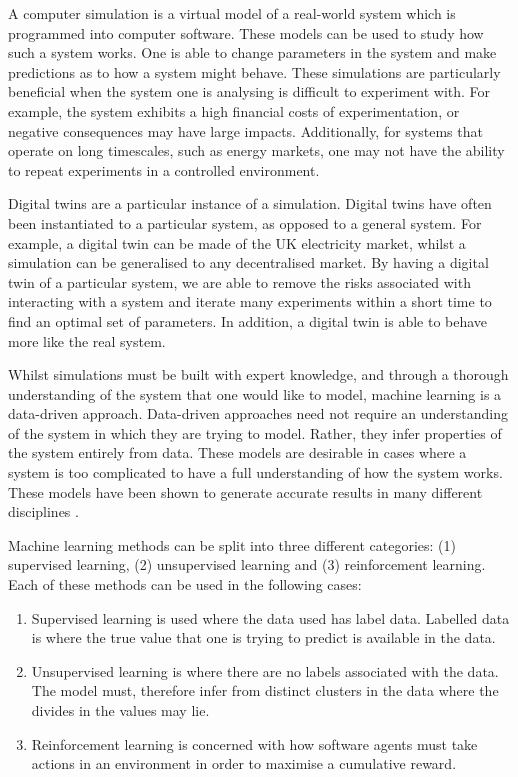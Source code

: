 A computer simulation is a virtual model of a real-world system which is programmed into computer software. These models can be used to study how such a system works. One is able to change parameters in the system and make predictions as to how a system might behave. These simulations are particularly beneficial when the system one is analysing is difficult to experiment with. For example, the system exhibits a high financial costs of experimentation, or negative consequences may have large impacts. Additionally, for systems that operate on long timescales, such as energy markets, one may not have the ability to repeat experiments in a controlled environment.

Digital twins are a particular instance of a simulation. Digital twins have often been instantiated to a particular system, as opposed to a general system. For example, a digital twin can be made of the UK electricity market, whilst a simulation can be generalised to any decentralised market. By having a digital twin of a particular system, we are able to remove the risks associated with interacting with a system and iterate many experiments within a short time to find an optimal set of parameters. In addition, a digital twin is able to behave more like the real system.

Whilst simulations must be built with expert knowledge, and through a thorough understanding of the system that one would like to model, machine learning is a data-driven approach. Data-driven approaches need not require an understanding of the system in which they are trying to model. Rather, they infer properties of the system entirely from data. These models are desirable in cases where a system is too complicated to have a full understanding of how the system works. These models have been shown to generate accurate results in many different disciplines \cite{Covington2016,WarrenLiao2005,Wiens2009}.

Machine learning methods can be split into three different categories: (1) supervised learning, (2) unsupervised learning and (3) reinforcement learning. Each of these methods can be used in the following cases:

\begin{enumerate}
	\item Supervised learning is used where the data used has label data. Labelled data is where the true value that one is trying to predict is available in the data.
	\item Unsupervised learning is where there are no labels associated with the data. The model must, therefore infer from distinct clusters in the data where the divides in the values may lie.
	\item Reinforcement learning is concerned with how software agents must take actions in an environment in order to maximise a cumulative reward.
\end{enumerate}

